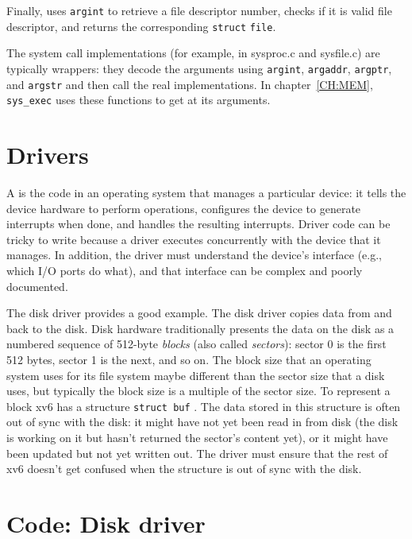 Finally,
uses
\lstinline{argint}
to retrieve a file descriptor number, checks if it is valid
file descriptor, and returns the corresponding
\lstinline{struct}
\lstinline{file}.

The system call implementations (for example, in sysproc.c and sysfile.c)
are typically wrappers: they decode the arguments using 
\lstinline{argint},
\lstinline{argaddr},
\lstinline{argptr}, 
and 
\lstinline{argstr}
and then call the real implementations.
In chapter~\ref{CH:MEM},
\lstinline{sys_exec}
uses these functions to get at its arguments.

\section{Drivers}

A
is the code in an operating system that manages a particular device:
it tells the device hardware to perform operations,
configures the device to generate interrupts when done,
and handles the resulting interrupts.
Driver code can be tricky to write
because a driver executes concurrently with the device that it manages.  In
addition, the driver must understand the device's interface (e.g., which I/O
ports do what), and that interface can be complex and poorly documented.

The disk driver provides a good example.  The disk driver copies data
from and back to the disk.  Disk hardware traditionally presents the data on the
disk as a numbered sequence of 512-byte 
\textit{blocks} 
(also called 
\textit{sectors}): 
sector 0 is the first 512 bytes, sector 1 is the next, and so on. The block size
that an operating system uses for its file system maybe different than the
sector size that a disk uses, but typically the block size is a multiple of the
sector size. To
represent a block xv6 has a structure
\lstinline{struct buf}
.
The
data stored in this structure is often out of sync with the disk: it might have
not yet been read in from disk (the disk is working on it but hasn't returned
the sector's content yet), or it might have been updated but not yet written
out.  The driver must ensure that the rest of xv6 doesn't get confused when the
structure is out of sync with the disk.

\section{Code: Disk driver}

